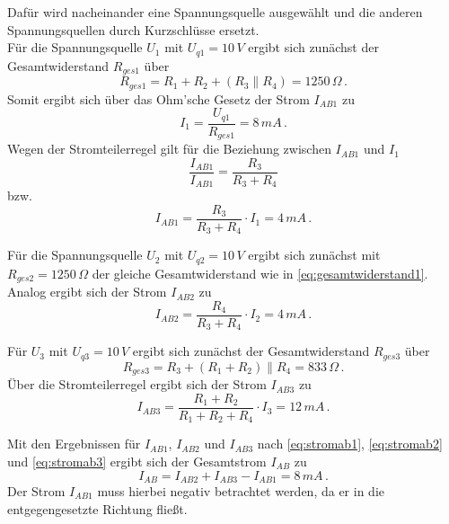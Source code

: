 Dafür wird nacheinander eine Spannungsquelle ausgewählt und die anderen Spannungsquellen durch Kurzschlüsse ersetzt.\\
Für die Spannungsquelle $U_1$ mit $U_{q1}=10\,V$ ergibt sich zunächst der Gesamtwiderstand $R_{ges1}$ über
\begin{equation}
    \label{eq:gesamtwiderstand1}
    R_{ges1}=R_1+R_2+(R_3\parallel R_4)=1250\,\Omega\, .
\end{equation}
Somit ergibt sich über das Ohm'sche Gesetz der Strom $I_{AB1}$ zu
\begin{equation*}
    I_{1}=\frac{U_{q1}}{R_{ges1}}=8\,mA\, .
\end{equation*}
Wegen der Stromteilerregel gilt für die Beziehung zwischen $I_{AB1}$ und $I_{1}$
\begin{equation*}
    \frac{I_{AB1}}{I_{AB1}}=\frac{R_3}{R_3+R_4}
\end{equation*}
bzw.
\begin{equation}
    \label{eq:stromab1}
    I_{AB1}=\frac{R_3}{R_3+R_4}\cdot{I_{1}}=4\,mA\, .
\end{equation}

Für die Spannungsquelle $U_2$ mit $U_{q2}=10\,V$ ergibt sich zunächst mit $R_{ges2} = 1250\,\Omega$ der gleiche Gesamtwiderstand wie in \eqref{eq:gesamtwiderstand1}. Analog ergibt sich der Strom $I_{AB2}$ zu
\begin{equation}
    \label{eq:stromab2}
    I_{AB2}=\frac{R_4}{R_3+R_4}\cdot{I_{2}}=4\,mA\, .
\end{equation}

Für $U_3$ mit $U_{q3}=10\,V$ ergibt sich zunächst der Gesamtwiderstand $R_{ges3}$ über
\begin{equation*}
    R_{ges3}=R_3+(R_1+R_2)\parallel R_4=833\,\Omega\, .
\end{equation*}
Über die Stromteilerregel ergibt sich der Strom $I_{AB3}$ zu
\begin{equation}
    \label{eq:stromab3}
    I_{AB3}=\frac{R_1 + R_2}{R_1+R_2+R_4}\cdot{I_{3}}=12\,mA\, .
\end{equation}

Mit den Ergebnissen für $I_{AB1}$, $I_{AB2}$ und $I_{AB3}$ nach \eqref{eq:stromab1}, \eqref{eq:stromab2} und \eqref{eq:stromab3}  ergibt sich der Gesamtstrom $I_{AB}$ zu
\begin{equation*}
    I_{AB}=I_{AB2}+I_{AB3}-I_{AB1}=8\,mA\, .
\end{equation*}
Der Strom $I_{AB1}$ muss hierbei negativ betrachtet werden, da er in die entgegengesetzte Richtung fließt.



